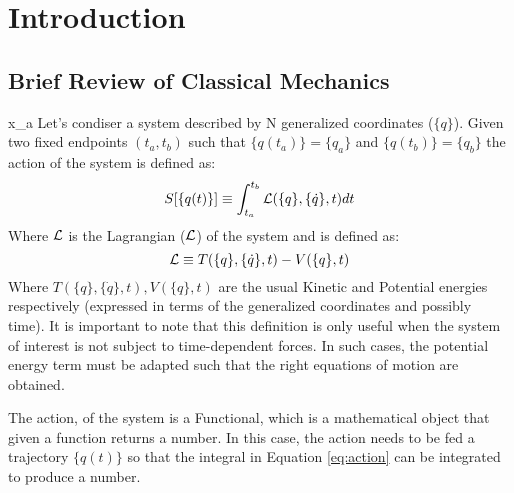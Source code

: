 \pagestyle{plain} 
\setcounter{page}{1}

\chapter{Introduction}


\section{Brief Review of Classical Mechanics}x_a
Let's condiser a system described by N generalized coordinates ($\{q\}$). Given two fixed endpoints $(t_a,t_b)$ such that $\{q(t_a)\}= \{q_a\}$ and $\{q(t_b)\} = \{q_b\}$ the action of the system is defined as:
\begin{equation}
    S[\{q(t)\}] \equiv \int_{t_a}^{t_b} \mathcal{L}(\{q\},\{\dot q\},t) dt
    \label{eq:action}
\end{equation}
Where $\mathcal{L}$ is the Lagrangian ($\mathcal{L}$) of the system and is defined as:
\begin{equation}
    \mathcal{L} \equiv T(\{q\},\{\dot q\},t) - V(\{q\},t)
\end{equation}
Where $T(\{q\},\{\dot q\},t), V(\{q\},t)$ are the usual Kinetic and Potential energies respectively (expressed in terms of the generalized coordinates and possibly time). It is important to note that this definition is only useful when the system of interest is not subject to time-dependent forces. In such cases, the potential energy term must be adapted such that the right equations of motion are obtained.

\vspace{1mm}\noindent
The action, of the system is a Functional, which is a mathematical object that given a function returns a number. In this case, the action needs to be fed a trajectory $\{q(t)\}$ so that the integral in Equation \ref{eq:action} can be integrated to produce a number.

